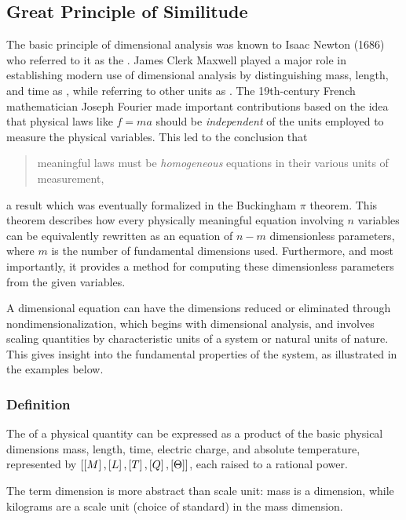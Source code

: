 \subsection{Great Principle of Similitude}
The basic principle of dimensional analysis was known to Isaac Newton (1686) who referred to it as the . James Clerk Maxwell played a major role in establishing modern use of dimensional analysis by distinguishing mass, length, and time as , while referring to other units as . The 19th-century French mathematician Joseph Fourier made important contributions based on the idea that physical laws like $f = ma$ should be \emph{independent} of the units employed to measure the physical variables. This led to the conclusion that
\begin{quote}
meaningful laws must be \emph{homogeneous} equations in their various units of measurement,
\end{quote}  
a result which was eventually formalized in the Buckingham $\pi$ theorem. This theorem describes how every physically meaningful equation involving $n$ variables can be equivalently rewritten as an equation of $n - m$ dimensionless parameters, where $m$ is the number of fundamental dimensions used. Furthermore, and most importantly, it provides a method for computing these dimensionless parameters from the given variables.

A dimensional equation can have the dimensions reduced or eliminated through nondimensionalization, which begins with dimensional analysis, and involves scaling quantities by characteristic units of a system or natural units of nature. This gives insight into the fundamental properties of the system, as illustrated in the examples below.


\subsubsection{Definition}
The  of a physical quantity can be expressed as a product of the basic physical dimensions mass, length, time, electric charge, and absolute temperature, represented by  $\left[{\left[{M}\right], \left[{L}\right], \left[{T}\right], \left[{Q}\right], \left[{\Theta}\right]}\right]$, each raised to a rational power.

The term dimension is more abstract than scale unit: mass is a dimension, while kilograms are a scale unit (choice of standard) in the mass dimension.

